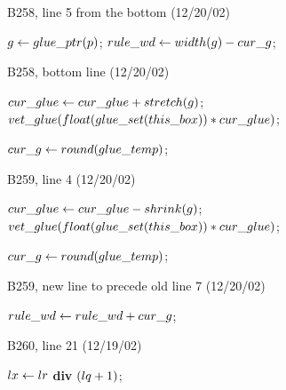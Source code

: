 {{\bugonpage B258, line 5 from the bottom (12/20/02)

\ninepoint\noindent
{} $g\gets\\{glue\_ptr}(p)$;
  $\\{rule\_wd}\gets\\{width}(g)-\\{cur\_g}$;

\bugonpage B258, bottom line (12/20/02)

\ninepoint\noindent
\qquad{} $\\{cur\_glue}\gets\\{cur\_glue}+\\{stretch}(g)$;
 $\\{vet\_glue}(\\{float}(\\{glue\_set}(\\{this\_box}))*\\{cur\_glue})$;\par
\noindent\qquad\qquad$\\{cur\_g}\gets\\{round}(\\{glue\_temp})$;

\bugonpage B259, line 4 (12/20/02)

\ninepoint\noindent
\qquad{} $\\{cur\_glue}\gets\\{cur\_glue}-\\{shrink}(g)$;
 $\\{vet\_glue}(\\{float}(\\{glue\_set}(\\{this\_box}))*\\{cur\_glue})$;\par
\noindent\qquad\qquad$\\{cur\_g}\gets\\{round}(\\{glue\_temp})$;

\bugonpage B259, new line to precede old line 7 (12/20/02)

\ninepoint\noindent
\quad$\\{rule\_wd}\gets\\{rule\_wd}+\\{cur\_g}$;

\bugonpage B260, line 21 (12/19/02)

\ninepoint\noindent
{} $\\{lx}\gets\\{lr}$ {\bf div} $(\\{lq}+1)$;

}}
